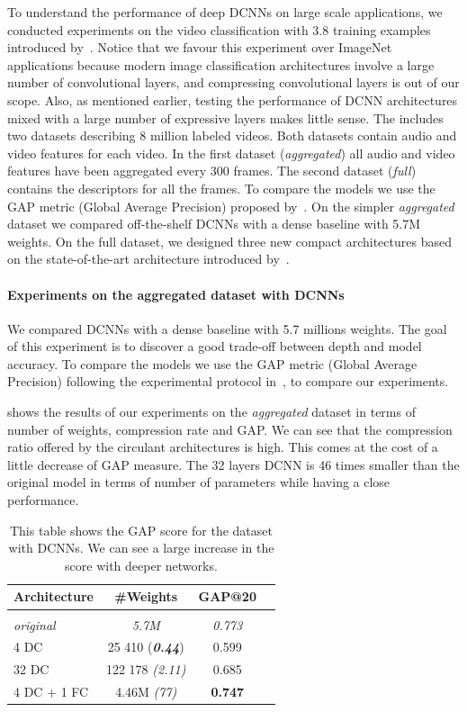 To understand the performance of deep DCNNs on large scale applications, we conducted experiments on the \yt video classification with 3.8 training examples introduced by~\citet{abu2016youtube}.
Notice that we favour this experiment over ImageNet applications because modern image classification architectures involve a large number of convolutional layers, and compressing convolutional layers is out of our scope. 
Also, as mentioned earlier, testing the performance of DCNN architectures mixed with a large number of expressive layers makes little sense.
The \yt includes two datasets describing 8 million labeled videos.
Both datasets contain audio and video features for each video.
In the first dataset (\emph{aggregated}) all audio and video features have been aggregated every 300 frames.
The second dataset (\emph{full}) contains the descriptors for all the frames.
To compare the models we use the GAP metric (Global Average Precision) proposed by~\citet{abu2016youtube}.
On the simpler \emph{aggregated} dataset we compared off-the-shelf DCNNs with a dense baseline with 5.7M weights.
On the full dataset, we designed three new compact architectures based on the state-of-the-art architecture introduced by~\citet{abu2016youtube}. 

\paragraph{Experiments on the aggregated dataset with DCNNs}
We compared DCNNs with a dense baseline with 5.7 millions weights.
The goal of this experiment is to discover a good trade-off between depth and model accuracy.
To compare the models we use the GAP metric (Global Average Precision) following the experimental protocol in~\cite{abu2016youtube}, to compare our experiments. 

 shows the results of our experiments on the \emph{aggregated} \yt dataset in terms of number of weights, compression rate and GAP.
We can see that the compression ratio offered by the circulant architectures is high.
This comes at the cost of a little decrease of GAP measure.
The 32 layers DCNN is 46 times smaller than the original model in terms of number of parameters while having a close performance. 


\begin{table}
  \centering
  \caption{This table shows the GAP score for the \yt dataset with DCNNs. We can see a large increase in the score with deeper networks.}
  \begin{tabular}{lccc}
    \toprule
    \textbf{Architecture} & \textbf{\#Weights} &
    \textbf{GAP@20} \\
    \hline \\
    \textit{original} & \textit{5.7M} & \textit{0.773} \\
    4 DC & 25 410  (\textit{\textbf{0.44}}) & 0.599   \\
    32 DC  & 122 178 \textit{(2.11)} & 0.685   \\
    4 DC + 1 FC & 4.46M \textit{(77)} & \textbf{0.747} \\
  \hline
  \end{tabular}
  \label{table:youtube_agg_xp}
\end{table}

